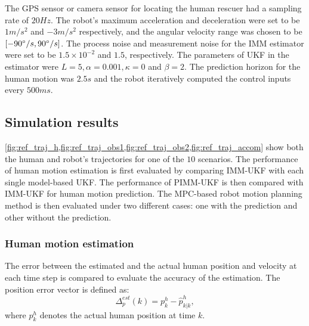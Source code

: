 \documentclass[journal]{IEEEtran}
\DeclareRobustCommand{\clnote}[1]{\ifthenelse{\boolean{include-notes}}%
{\textcolor{orange}{\textbf{CL: #1}}}{}}
\DeclareRobustCommand{\dhnote}[1]{\ifthenelse{\boolean{include-notes}}%
{\textcolor{blue}{\textbf{DH: #1}}}{}}
\begin{document}
	The GPS sensor or camera sensor for locating the human rescuer had a sampling rate of $20Hz$.
	The robot's maximum acceleration and deceleration were set to be $1 m/s^2$ and $-3 m/s^2$ respectively, and the angular velocity range was chosen to be $[-90\degree/s,90\degree/s]$.
	The process noise and measurement noise for the IMM estimator were set to be $1.5\times 10^{-2}$ and $1.5$, respectively. 
    The parameters of UKF in the estimator were $L=5,\alpha=0.001, \kappa=0$ and $\beta=2$.
	The prediction horizon for the human motion was $2.5s$ and the robot iteratively computed the control inputs every $500ms$.
    
\subsection{Simulation results}
	\cref{fig:ref_traj_h,fig:ref_traj_obs1,fig:ref_traj_obs2,fig:ref_traj_accom} show both the human and robot's trajectories for one of the $10$ scenarios.	
The performance of human motion estimation is first evaluated by comparing IMM-UKF with each single model-based UKF. The performance of PIMM-UKF is then compared with IMM-UKF for human motion prediction.
	The MPC-based robot motion planning method is then evaluated under two different cases: one with the prediction and other without the prediction.
	\subsubsection{Human motion estimation}\label{subsubsec:motion_est}
	The error between the estimated and the actual human position and velocity at each time step is compared to evaluate the accuracy of the estimation.
	The position error vector is defined as:
	\[
	\Delta^{est}_p(k)=p^h_k-\hat{p}^h_{k|k}\label{eqn:track_err_pos},
	\] \normalsize
	where $p^h_k$ denotes the actual human position at time $k$. 
	
\end{document}
